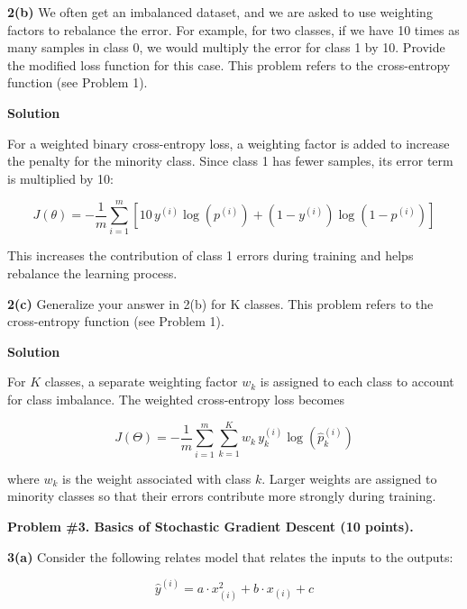 \documentclass[12pt]{article}
\begin{document}
	\newpage
	
	\noindent\textbf{2(b)} We often get an imbalanced dataset, and we are asked to use weighting factors to rebalance the error. For example, for two classes, if we have 10 times as many samples in class 0, we would multiply the error for class 1 by 10. Provide the modified loss function for this case. This problem refers to the cross-entropy function (see Problem 1).
	
	\vspace{0.2cm}
	
	\noindent\textbf{Solution}
	
	For a weighted binary cross-entropy loss, a weighting factor is added to increase the penalty for the minority class. Since class 1 has fewer samples, its error term is multiplied by 10:
	
	\[
	J(\theta)
	=
	-\frac{1}{m}
	\sum_{i=1}^{m}
	\left[
	10\,y^{(i)}\log\left(p^{(i)}\right)
	+
	\left(1-y^{(i)}\right)\log\left(1-p^{(i)}\right)
	\right]
	\]
	
	This increases the contribution of class 1 errors during training and helps rebalance the learning process.
	
	\newpage
	
	\noindent\textbf{2(c)} Generalize your answer in 2(b) for K classes. This problem refers to the cross-entropy function (see Problem 1).
	
	\vspace{0.2cm}
	
	\noindent\textbf{Solution}
	
	For \(K\) classes, a separate weighting factor \(w_k\) is assigned to each class to account for class imbalance. The weighted cross-entropy loss becomes
	
	\[
	J(\Theta)
	=
	-\frac{1}{m}
	\sum_{i=1}^{m}
	\sum_{k=1}^{K}
	w_k\,y_k^{(i)}
	\log\left(\hat{p}_k^{(i)}\right)
	\]
	
	where \(w_k\) is the weight associated with class \(k\). Larger weights are assigned to minority classes so that their errors contribute more strongly during training.
	
	\newpage
	
	\noindent\textbf{Problem \#3. Basics of Stochastic Gradient Descent (10 points).}
	
	\noindent\textbf{3(a)} Consider the following relates model that relates the inputs to the outputs:
	
	\[
	\hat{y}^{(i)} = a \cdot x_{(i)}^2 + b \cdot x_{(i)} + c
	\]
	
\end{document}
